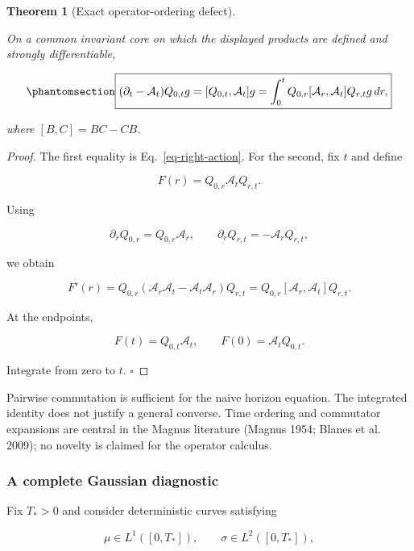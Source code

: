 \documentclass[
  english,
  11pt,
  letterpaper,
  DIV=11,
  numbers=noendperiod]{scrartcl}
\theoremstyle{plain}
\newtheorem{theorem}{Theorem}[section]
\theoremstyle{plain}
\theoremstyle{plain}
\theoremstyle{plain}
\theoremstyle{remark}
\begin{document}
\begin{theorem}[Exact operator-ordering
defect]\protect\hypertarget{thm-commutator-defect}{}\label{thm-commutator-defect}

On a common invariant core on which the displayed products are defined
and strongly differentiable,

\begin{equation}\protect\phantomsection\label{eq-commutator-defect}{
\boxed{
(\partial_t-\mathcal A_t)Q_{0,t}g
=[Q_{0,t},\mathcal A_t]g
=\int_0^t
Q_{0,r}
[\mathcal A_r,\mathcal A_t]
Q_{r,t}g\,dr,
}
}\end{equation}

where \([B,C]=BC-CB\).

\end{theorem}

\begin{proof}
The first equality is Eq.~\ref{eq-right-action}. For the second, fix
\(t\) and define

\[
F(r)=Q_{0,r}\mathcal A_tQ_{r,t}.
\]

Using

\[
\partial_rQ_{0,r}=Q_{0,r}\mathcal A_r,
\qquad
\partial_rQ_{r,t}=-\mathcal A_rQ_{r,t},
\]

we obtain

\[
F'(r)
=Q_{0,r}
(\mathcal A_r\mathcal A_t-\mathcal A_t\mathcal A_r)
Q_{r,t}
=Q_{0,r}[\mathcal A_r,\mathcal A_t]Q_{r,t}.
\]

At the endpoints,

\[
F(t)=Q_{0,t}\mathcal A_t,
\qquad
F(0)=\mathcal A_tQ_{0,t}.
\]

Integrate from zero to \(t\). \(\square\)
\end{proof}

Pairwise commutation is sufficient for the naive horizon equation. The
integrated identity does not justify a general converse. Time ordering
and commutator expansions are central in the Magnus literature (Magnus
1954; Blanes et al. 2009); no novelty is claimed for the operator
calculus.

\subsubsection{A complete Gaussian
diagnostic}\label{a-complete-gaussian-diagnostic}

Fix \(T_*>0\) and consider deterministic curves satisfying

\[
\mu\in L^1([0,T_*]),
\qquad
\sigma\in L^2([0,T_*]),
\]
\end{document}
